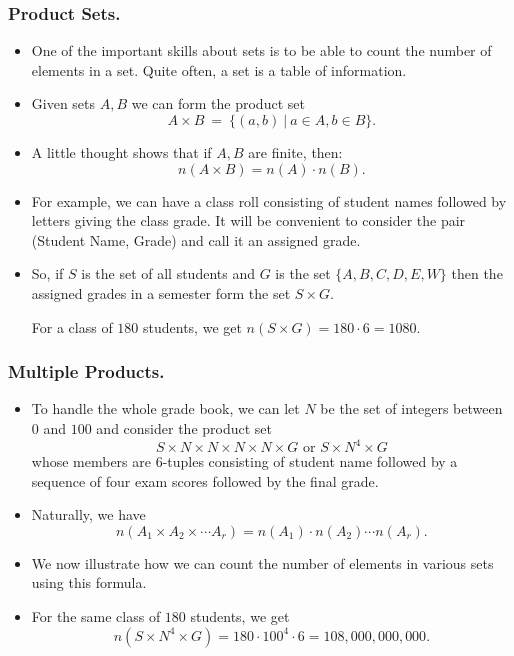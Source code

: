 \begin{frame} %

  \frametitle{Product Sets.}
 \begin{itemize}%
\item One of the important skills about sets is to be able to count the
number of elements in a set. Quite often, a set is a table of
information.

\item Given sets $A,B$ we can form the product set
$$A\times B ~=~ \{(a,b) ~|~ a\in A, b\in B\}.$$

\item A little thought shows that if $A,B$ are finite, then:
$$n(A\times B) = n(A)\cdot n(B).$$

\item For example, we can have a class roll consisting of student names
followed by letters giving the class grade. It will be convenient to
consider the pair   (Student Name, Grade) and call it an assigned grade.


\item So, if $S$ is the set of all students and $G$ is the set
$\{A,B,C,D,E,W\}$ then the assigned grades in a semester form
the set $S\times G$.

For a class of $180$ students, we get  $n(S\times G)=180\cdot 6=1080$.

\end{itemize}
\end{frame}

%


\begin{frame}%
  \frametitle{Multiple Products.}
  \begin{itemize}%



\item To handle the whole grade book, we can let $N$ be the set of integers
between  $0$ and $100$ and consider the product set
$$S\times N\times N\times N\times N\times G \mbox{ or }
S\times N^4 \times G$$
whose members are 6-tuples consisting of student name followed by a
sequence of four exam scores followed by the final grade.

\item Naturally, we have 
$$n(A_1 \times A_2 \times \cdots A_r) = n(A_1)\cdot n(A_2)\cdots
n(A_r).$$

\item We now illustrate how we can count the number of elements in
various sets using this formula.

\item For the same class of $180$ students, we get
$$n(S\times N^4 \times G) = 180\cdot 100^4 \cdot 6 = 108,000,000,000.$$



\end{itemize}
\end{frame}
%


